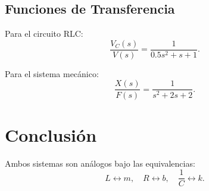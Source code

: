 \documentclass[12pt, a4paper]{article}
\begin{document}
\subsection{Funciones de Transferencia}
Para el circuito RLC:
\[
\frac{V_C(s)}{V(s)} = \frac{1}{0.5 s^2 + s + 1}.
\]

Para el sistema mecánico:
\[
\frac{X(s)}{F(s)} = \frac{1}{s^2 + 2s + 2}.
\]

\section{Conclusión}
Ambos sistemas son análogos bajo las equivalencias:
\[
L \leftrightarrow m, \quad R \leftrightarrow b, \quad \frac{1}{C} \leftrightarrow k.
\]
\end{document}
